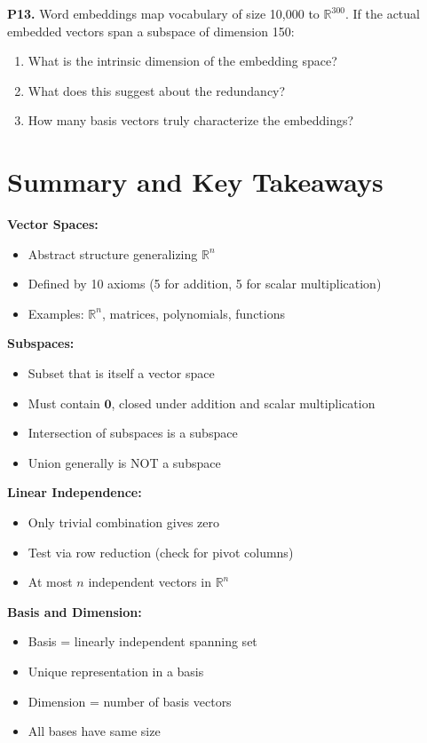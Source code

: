 \documentclass[12pt,a4paper]{article}
\theoremstyle{definition}
\begin{document}
\textbf{P13.} Word embeddings map vocabulary of size 10,000 to $\mathbb{R}^{300}$. If the actual embedded vectors span a subspace of dimension 150:
\begin{enumerate}[label=(\alph*)]
    \item What is the intrinsic dimension of the embedding space?
    \item What does this suggest about the redundancy?
    \item How many basis vectors truly characterize the embeddings?
\end{enumerate}

\section{Summary and Key Takeaways}

\begin{tcolorbox}[enhanced,breakable,colback=yellow!10!white,colframe=orange!75!black,title=Essential Concepts]
\textbf{Vector Spaces:}
\begin{itemize}
    \item Abstract structure generalizing $\mathbb{R}^n$
    \item Defined by 10 axioms (5 for addition, 5 for scalar multiplication)
    \item Examples: $\mathbb{R}^n$, matrices, polynomials, functions
\end{itemize}

\textbf{Subspaces:}
\begin{itemize}
    \item Subset that is itself a vector space
    \item Must contain $\mathbf{0}$, closed under addition and scalar multiplication
    \item Intersection of subspaces is a subspace
    \item Union generally is NOT a subspace
\end{itemize}

\textbf{Linear Independence:}
\begin{itemize}
    \item Only trivial combination gives zero
    \item Test via row reduction (check for pivot columns)
    \item At most $n$ independent vectors in $\mathbb{R}^n$
\end{itemize}

\textbf{Basis and Dimension:}
\begin{itemize}
    \item Basis = linearly independent spanning set
    \item Unique representation in a basis
    \item Dimension = number of basis vectors
    \item All bases have same size
\end{itemize}


\end{tcolorbox}
\end{document}
